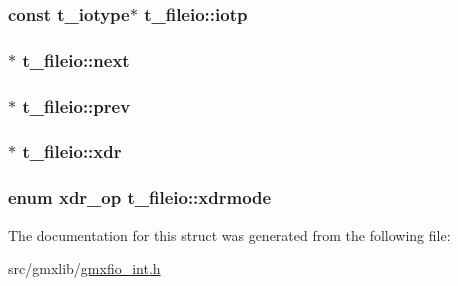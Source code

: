 \hypertarget{structt__fileio_aa37d00c25e65b3a2ec2e67882c9f06d6}{
\subsubsection[{iotp}]{\setlength{\rightskip}{0pt plus 5cm}const {\bf t\-\_\-iotype}$\ast$ {\bf t\-\_\-fileio\-::iotp}}}\label{structt__fileio_aa37d00c25e65b3a2ec2e67882c9f06d6}
\hypertarget{structt__fileio_a64c2b79f4928f2dfb76daa6e4378fb3b}{
\subsubsection[{next}]{$\ast$ {\bf t\-\_\-fileio\-::next}}}\label{structt__fileio_a64c2b79f4928f2dfb76daa6e4378fb3b}
\hypertarget{structt__fileio_a78d6ba9ce30c278a4de1c949d97c5b15}{
\subsubsection[{prev}]{ $\ast$ {\bf t\-\_\-fileio\-::prev}}}\label{structt__fileio_a78d6ba9ce30c278a4de1c949d97c5b15}
\hypertarget{structt__fileio_a66b8b7efd18d0948d0ef2baf6ecbc574}{
\subsubsection[{xdr}]{$\ast$ {\bf t\-\_\-fileio\-::xdr}}}\label{structt__fileio_a66b8b7efd18d0948d0ef2baf6ecbc574}
\hypertarget{structt__fileio_afe7973429cc8bcda3a89fed48f544c36}{
\subsubsection[{xdrmode}]{\setlength{\rightskip}{0pt plus 5cm}enum {\bf xdr\-\_\-op} {\bf t\-\_\-fileio\-::xdrmode}}}\label{structt__fileio_afe7973429cc8bcda3a89fed48f544c36}


\-The documentation for this struct was generated from the following file\-:\begin{DoxyCompactItemize}
\item 
src/gmxlib/\hyperlink{gmxfio__int_8h}{gmxfio\-\_\-int.\-h}\end{DoxyCompactItemize}

